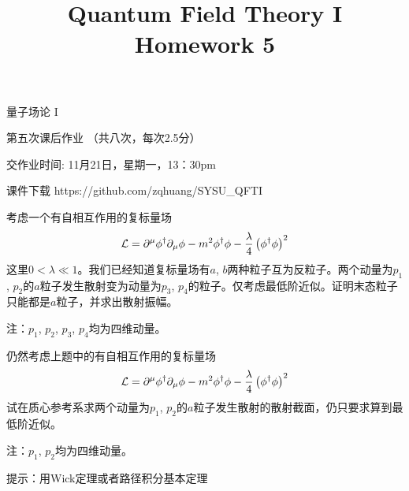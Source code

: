 \documentclass[CJK]{beamer}
\title{Quantum Field Theory I \\ Homework 5}
\author{}
\date{}
\begin{document}
\begin{frame}
 
\begin{center}
\begin{Large}
\bch
量子场论 I 

{\vskip 0.3in}

第五次课后作业 （共八次，每次2.5分）

交作业时间: 11月21日，星期一，13：30pm

\ech
\end{Large}
\end{center}

\vskip 0.2in

\bch
课件下载
\ech
https://github.com/zqhuang/SYSU\_QFTI

\end{frame}

\begin{frame}
\bch
考虑一个有自相互作用的复标量场
$$ {\mathcal{L}} = \partial^\mu\phi^\dagger \partial_\mu \phi - m^2\phi^\dagger\phi - \frac{\lambda}{4}\left(\phi^\dagger\phi\right)^2$$
这里$0<\lambda\ll 1$。我们已经知道复标量场有$a$, $b$两种粒子互为反粒子。两个动量为$p_1$, $p_2$的$a$粒子发生散射变为动量为$p_3$, $p_4$的粒子。仅考虑最低阶近似。证明末态粒子只能都是$a$粒子，并求出散射振幅。

\skipline
{\small
注：$p_1$, $p_2$, $p_3$, $p_4$均为四维动量。}
\ech
\end{frame}

\begin{frame}
\bch
仍然考虑上题中的有自相互作用的复标量场
$$ {\mathcal{L}} = \partial^\mu\phi^\dagger \partial_\mu \phi - m^2\phi^\dagger\phi - \frac{\lambda}{4}\left(\phi^\dagger\phi\right)^2$$
试在质心参考系求两个动量为$p_1$, $p_2$的$a$粒子发生散射的散射截面，仍只要求算到最低阶近似。

\skipline
{\small
注：$p_1$, $p_2$均为四维动量。}

\ech
\end{frame}

\begin{frame}

\skiplines
{\scriptsize 提示：用Wick定理或者路径积分基本定理}
\ech
\end{frame}
\end{document}

